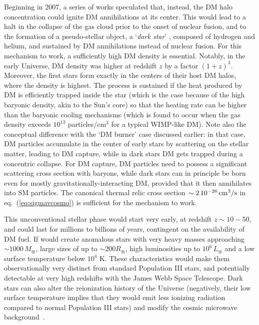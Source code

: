 Beginning in 2007, a series of works speculated that, instead, the DM halo concentration could ignite DM annihilations at its center. This would lead to a halt in the collapse of the gas cloud prior to the onset of nuclear fusion,
and to the formation of a pseudo-stellar object,  a `{\em dark star}' \cite{DarkStars}, composed of hydrogen and helium, 
and sustained by DM annihilations instead of nuclear fusion.
For this mechanism to work, a sufficiently high DM density is essential. Notably, in the early Universe, DM density was higher at redshift $z$ by a factor $(1 + z)^3$. Moreover, the first stars form exactly in the centers of their host DM halos, where the density is highest.
The process is sustained if the heat produced by DM is efficiently trapped inside the star (which is the case because of the high baryonic density,
akin to the Sun's core) so that the heating rate can be higher than the baryonic cooling mechanisms (which is found to occur when the gas density exceeds $10^{13}$ particles/cm$^{3}$ for a typical WIMP-like DM). Note also the conceptual difference with the `DM burner' case discussed earlier: in that case, DM particles accumulate in the center of early stars by scattering on the stellar matter, leading to DM capture, while in dark stars DM gets trapped during a concentric collapse. For DM capture, DM particles need to possess a significant scattering cross section with baryons, while dark stars can in principle be born even for mostly gravitationally-interacting DM, provided that it then annihilates into SM particles.
The canonical thermal relic cross section $\sim 2\, 10^{-26}\, {\rm cm}^3/{\rm s}$ in  eq.~(\ref{eq:sigmavcosmo}) is sufficient for the mechanism to work.


This unconventional stellar phase would start very early, at redshift $z \sim 10-50$, and could last for millions to billions of years, 
contingent on the availability of DM fuel. If would create anomalous stars with very heavy masses approaching $\sim1000 \, M_\circledast$, 
large sizes of up to $\sim 200 R_\circledast$, 
high luminosities up to $10^6 \, L_\circledast$ and a low surface temperature below $10^4$ K. 
These characteristics would make them observationally very distinct from standard Population III stars, and potentially detectable at very high redshifts with the James Webb Space Telescope. 
Dark stars can also alter the reionization history of the Universe
(negatively,
their low surface temperature implies that they would emit less ionizing radiation compared to normal Population III stars) and modify the cosmic microwave background~\cite{DarkStars}. 

